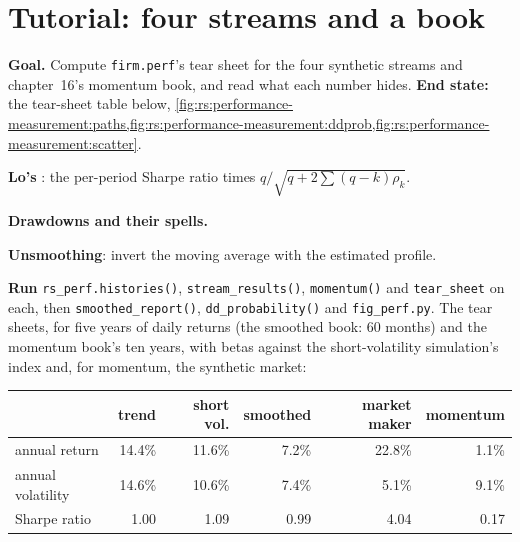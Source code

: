 \section{Tutorial: four streams and a book}\label{tut:rs:performance-measurement:tut}

\begin{tutorial}
\textbf{Goal.} Compute \texttt{firm.perf}'s tear sheet for the four synthetic streams and chapter~16's momentum book, and read what each number hides.
\textbf{End state:} the tear-sheet table below, \cref{fig:rs:performance-measurement:paths,fig:rs:performance-measurement:ddprob,fig:rs:performance-measurement:scatter}.
\begin{tutsteps}
\item \textbf{Lo's }: the per-period Sharpe ratio times $q/\sqrt{q + 2\sum(q-k)\rho_k}$.
\label{lst:rs:performance-measurement:lo}
\item \textbf{Drawdowns and their spells.}
\label{lst:rs:performance-measurement:dd}
\item \textbf{Unsmoothing}: invert the moving average with the estimated profile.
\label{lst:rs:performance-measurement:unsmooth}
\item \textbf{Run} \texttt{rs\_perf.histories()}, \texttt{stream\_results()}, \texttt{momentum()} and \texttt{tear\_sheet} on each, then \texttt{smoothed\_report()},
\texttt{dd\_probability()} and \texttt{fig\_perf.py}. The tear sheets, for five years of daily returns (the smoothed book: 60 months) and the momentum book's
ten years, with betas against the short-volatility simulation's index and, for momentum, the synthetic market:
\end{tutsteps}
\begin{center}
\small
\begin{tabular}{@{}lrrrrr@{}}
\toprule
 & trend & short vol. & smoothed & market maker & momentum\\
\midrule
annual return & 14.4\% & 11.6\% & 7.2\% & 22.8\% & 1.1\%\\
annual volatility & 14.6\% & 10.6\% & 7.4\% & 5.1\% & 9.1\%\\
Sharpe ratio & 1.00 & 1.09 & 0.99 & 4.04 & 0.17\\

\end{tabular}
\end{center}
\end{tutorial}
